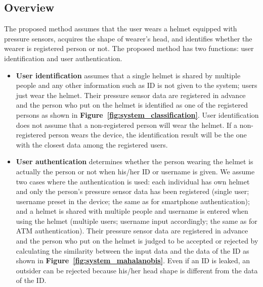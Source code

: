 \documentclass[sigchi,authordraft]{acmart}
\newcommand\figref[1]{\textbf{Figure~\ref{fig:#1}}}
\begin{document}
\subsection{Overview}
The proposed method assumes that the user wears a helmet equipped with pressure sensors, acquires the shape of wearer's head, and identifies whether the wearer is registered person or not. The proposed method has two functions: user identification and user authentication.
\begin{itemize}
    \item {\bf User identification} assumes that a single helmet is shared by multiple people and any other information such as ID is not given to the system; users just wear the helmet. Their pressure sensor data are registered in advance and the person who put on the helmet is identified as one of the registered persons as shown in \figref{system_classification}. User identification does not assume that a non-registered person will wear the helmet. If a non-registered person wears the device, the identification result will be the one with the closest data among the registered users.
    
    \item {\bf User authentication} determines whether the person wearing the helmet is actually the person or not when his/her ID or username is given. We assume two cases where the authentication is used: each individual has own helmet and only the person's pressure sensor data has been registered (single user; username preset in the device; the same as for smartphone authentication); and a helmet is shared with multiple people and username is entered when using the helmet (multiple users; username input accordingly; the same as for ATM authentication). Their pressure sensor data are registered in advance and the person who put on the helmet is judged to be accepted or rejected by calculating the similarity between the input data and the data of the ID as shown in \figref{system_mahalanobis}. Even if an ID is leaked, an outsider can be rejected because his/her head shape is different from the data of the ID.
\end{itemize}

\end{document}

